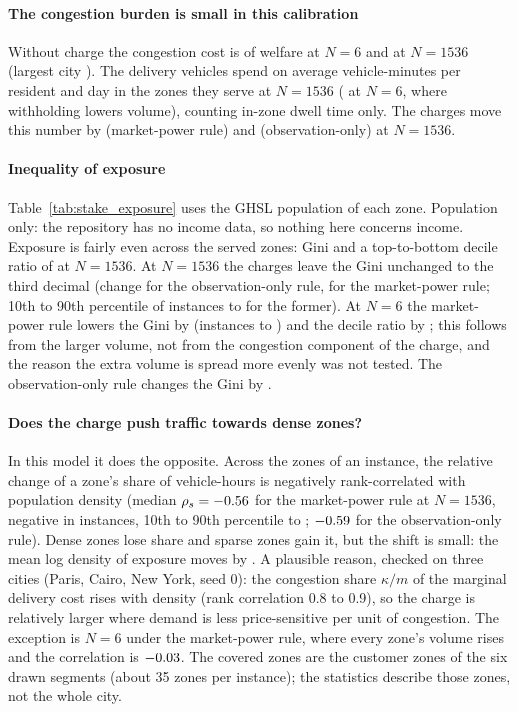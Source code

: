 \paragraph{The congestion burden is small in this calibration} Without charge the congestion cost is \pc{\LSixCCshare} of welfare at $N=6$ and \pc{\LBigCCshare} at $N=1536$ (largest city \pc{\LBigCCshareMax}). The delivery vehicles spend on average \ExpBigMean{} vehicle-minutes per resident and day in the zones they serve at $N=1536$ (\ExpSixMean{} at $N=6$, where withholding lowers volume), counting in-zone dwell time only. The charges move this number by \pc{\ExpBigPmdExp} (market-power rule) and \pc{\ExpBigObsdExp} (observation-only) at $N=1536$.



\paragraph{Inequality of exposure} Table~\ref{tab:stake_exposure} uses the GHSL population of each zone. Population only: the repository has no income data, so nothing here concerns income. Exposure is fairly even across the served zones: Gini \ExpBigGiniNone{} and a top-to-bottom decile ratio of \ExpBigDtenNone{} at $N=1536$. At $N=1536$ the charges leave the Gini unchanged to the third decimal (change \ExpBigObsdGini{} for the observation-only rule, \ExpBigPmdGini{} for the market-power rule; 10th to 90th percentile of instances \ExpBigObsdGiniMin{} to \ExpBigObsdGiniMax{} for the former). At $N=6$ the market-power rule lowers the Gini by \ExpSixPmdGini{} (instances \ExpSixPmdGiniMin{} to \ExpSixPmdGiniMax) and the decile ratio by \ExpSixPmdDten; this follows from the \pc{\ExpSixPmdExp} larger volume, not from the congestion component of the charge, and the reason the extra volume is spread more evenly was not tested. The observation-only rule changes the Gini by \ExpSixObsdGini.

\paragraph{Does the charge push traffic towards dense zones?} In this model it does the opposite. Across the zones of an instance, the relative change of a zone's share of vehicle-hours is negatively rank-correlated with population density (median $\rho_s=-0.56$ for the market-power rule at $N=1536$, negative in \ExpBigPmCorrNeg{} instances, 10th to 90th percentile \ExpBigPmCorrMin{} to \ExpBigPmCorrMax; $-0.59$ for the observation-only rule). Dense zones lose share and sparse zones gain it, but the shift is small: the mean log density of exposure moves by \ExpBigPmShift. A plausible reason, checked on three cities (Paris, Cairo, New York, seed 0): the congestion share $\kappa/m$ of the marginal delivery cost rises with density (rank correlation 0.8 to 0.9), so the charge is relatively larger where demand is less price-sensitive per unit of congestion. The exception is $N=6$ under the market-power rule, where every zone's volume rises and the correlation is $-0.03$. The covered zones are the customer zones of the six drawn segments (about 35 zones per instance); the statistics describe those zones, not the whole city.

